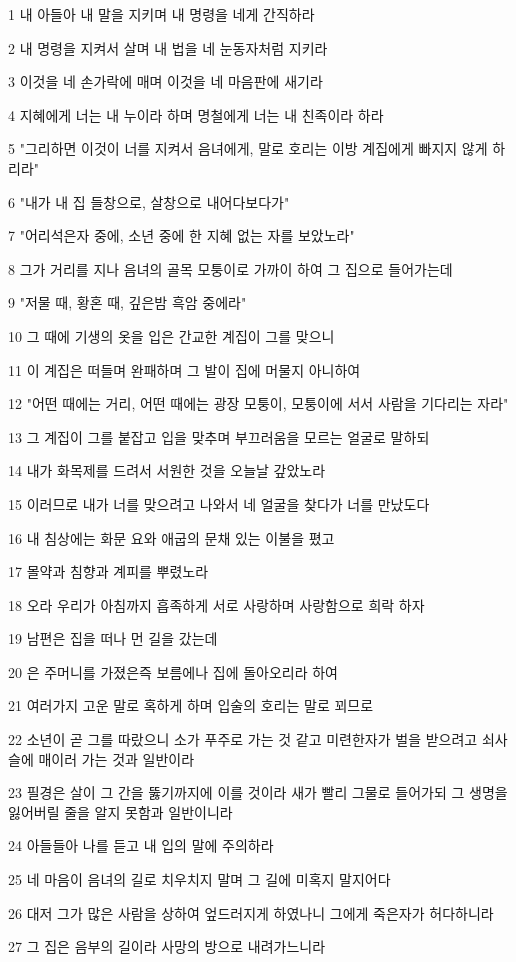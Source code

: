 \par 1 내 아들아 내 말을 지키며 내 명령을 네게 간직하라
\par 2 내 명령을 지켜서 살며 내 법을 네 눈동자처럼 지키라
\par 3 이것을 네 손가락에 매며 이것을 네 마음판에 새기라
\par 4 지혜에게 너는 내 누이라 하며 명철에게 너는 내 친족이라 하라
\par 5 "그리하면 이것이 너를 지켜서 음녀에게, 말로 호리는 이방 계집에게 빠지지 않게 하리라"
\par 6 "내가 내 집 들창으로, 살창으로 내어다보다가"
\par 7 "어리석은자 중에, 소년 중에 한 지혜 없는 자를 보았노라"
\par 8 그가 거리를 지나 음녀의 골목 모퉁이로 가까이 하여 그 집으로 들어가는데
\par 9 "저물 때, 황혼 때, 깊은밤 흑암 중에라"
\par 10 그 때에 기생의 옷을 입은 간교한 계집이 그를 맞으니
\par 11 이 계집은 떠들며 완패하며 그 발이 집에 머물지 아니하여
\par 12 "어떤 때에는 거리, 어떤 때에는 광장 모퉁이, 모퉁이에 서서 사람을 기다리는 자라"
\par 13 그 계집이 그를 붙잡고 입을 맞추며 부끄러움을 모르는 얼굴로 말하되
\par 14 내가 화목제를 드려서 서원한 것을 오늘날 갚았노라
\par 15 이러므로 내가 너를 맞으려고 나와서 네 얼굴을 찾다가 너를 만났도다
\par 16 내 침상에는 화문 요와 애굽의 문채 있는 이불을 폈고
\par 17 몰약과 침향과 계피를 뿌렸노라
\par 18 오라 우리가 아침까지 흡족하게 서로 사랑하며 사랑함으로 희락 하자
\par 19 남편은 집을 떠나 먼 길을 갔는데
\par 20 은 주머니를 가졌은즉 보름에나 집에 돌아오리라 하여
\par 21 여러가지 고운 말로 혹하게 하며 입술의 호리는 말로 꾀므로
\par 22 소년이 곧 그를 따랐으니 소가 푸주로 가는 것 같고 미련한자가 벌을 받으려고 쇠사슬에 매이러 가는 것과 일반이라
\par 23 필경은 살이 그 간을 뚫기까지에 이를 것이라 새가 빨리 그물로 들어가되 그 생명을 잃어버릴 줄을 알지 못함과 일반이니라
\par 24 아들들아 나를 듣고 내 입의 말에 주의하라
\par 25 네 마음이 음녀의 길로 치우치지 말며 그 길에 미혹지 말지어다
\par 26 대저 그가 많은 사람을 상하여 엎드러지게 하였나니 그에게 죽은자가 허다하니라
\par 27 그 집은 음부의 길이라 사망의 방으로 내려가느니라

